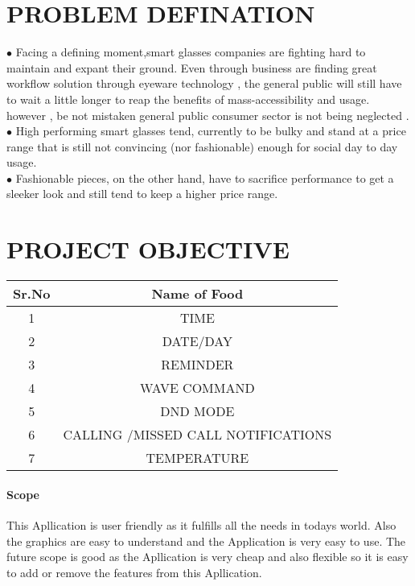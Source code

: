 \documentclass[12pt,a4paper,final,oneside]{report}
\begin{document}
	
	
	\chapter{PROBLEM DEFINATION}
	$\bullet$ Facing a defining moment,smart glasses companies are fighting hard to maintain and expant their ground. Even through business are finding great workflow solution through eyeware technology , the general public will still have to wait a little longer to reap the benefits of mass-accessibility and usage. however , be not mistaken general public consumer sector is not being neglected .\\
	$\bullet$ High performing smart glasses tend, currently to be bulky and stand at a price range that is still not convincing (nor fashionable) enough for social day to day usage.\\
	$\bullet$ Fashionable pieces, on the other hand, have to sacrifice performance to get a sleeker look and still tend to keep a higher price range.\\
	
	\chapter{PROJECT OBJECTIVE}
	\vspace{0.5cm}
	\centering 
	\begin{tabular}{|c|c|}
		\hline Sr.No & Name of Food \\
		\hline 1 & TIME\\
		\hline 2 & DATE/DAY \\
		\hline 3 & REMINDER \\
		\hline 4 & WAVE COMMAND \\
		\hline 5 &  DND MODE\\
		\hline 6 & CALLING /MISSED CALL NOTIFICATIONS \\
		\hline 7 &  TEMPERATURE\\
		\hline
	\end{tabular}

     \subsubsection {Scope}

      This Apllication is user friendly as it fulfills all the needs in todays world. Also the graphics are easy to understand and the Application is very easy to use. The future scope is good as the Apllication is very cheap and also flexible so it is easy to add or remove the features from this Apllication.
	
\end{document}
